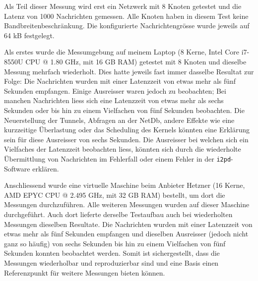 Als Teil dieser Messung wird erst ein Netzwerk mit 8 Knoten getestet und die Latenz von 1000 Nachrichten gemessen.
Alle Knoten haben in diesem Test keine Bandbreitenbeschränkung.
Die konfigurierte Nachrichtengrösse wurde jeweils auf 64 kB festgelegt.

Als erstes wurde die Messumgebung auf meinem Laptop (8 Kerne, Intel Core i7-8550U CPU @ 1.80 GHz, mit 16 GB RAM) getestet mit 8 Knoten und dieselbe Messung mehrfach wiederholt.
Dies hatte jeweils fast immer dasselbe Resultat zur Folge:
Die Nachrichten wurden mit einer Latenzzeit von etwas mehr als fünf Sekunden empfangen.
Einige Ausreisser waren jedoch zu beobachten;
Bei manchen Nachrichten liess sich eine Latenzzeit von etwas mehr als sechs Sekunden oder bis hin zu einem Vielfachen von fünf Sekunden beobachten.
Die Neuerstellung der Tunnels, Abfragen an der NetDb, andere Effekte wie eine kurzzeitige Überlastung oder das Scheduling des Kernels könnten eine Erklärung sein für diese Ausreisser von sechs Sekunden.
Die Ausreisser bei welchen sich ein Vielfaches der Latenzzeit beobachten liess,
könnten sich durch die wiederholte Übermittlung von Nachrichten im Fehlerfall
oder einem Fehler in der \lstinline|i2pd|-Software erklären.

Anschliessend wurde eine virtuelle Maschine beim Anbieter Hetzner (16 Kerne, AMD EPYC CPU @ 2.495 GHz, mit 32 GB RAM) bestellt, um dort die Messungen durchzuführen.
Alle weiteren Messungen wurden auf dieser Maschine durchgeführt.
Auch dort lieferte derselbe Testaufbau auch bei wiederholten Messungen dieselben Resultate.
Die Nachrichten wurden mit einer Latenzzeit von etwas mehr als fünf Sekunden empfangen
und dieselben Ausreisser (jedoch nicht ganz so häufig) von sechs Sekunden bis hin zu einem Vielfachen von fünf Sekunden konnten beobachtet werden.
Somit ist sichergestellt, dass die Messungen wiederholbar und reproduzierbar sind und eine Basis einen Referenzpunkt für weitere Messungen bieten können.

%
%
%


